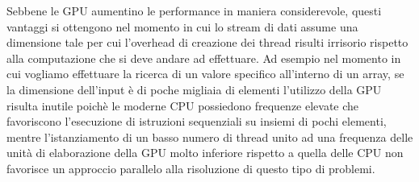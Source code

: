 Sebbene le GPU aumentino le performance in maniera considerevole, questi
vantaggi si ottengono nel momento in cui lo stream di dati assume
una dimensione tale per cui l'overhead di creazione dei thread risulti
irrisorio rispetto alla computazione che si deve andare ad effettuare.
Ad esempio nel momento in cui vogliamo effettuare la ricerca di un valore
specifico all'interno di un array, se la dimensione dell'input è di poche
migliaia di elementi l'utilizzo della GPU risulta inutile poichè
le moderne CPU possiedono frequenze elevate che favoriscono l'esecuzione
di istruzioni sequenziali su insiemi di pochi elementi, mentre l'istanziamento
di un basso numero di thread unito ad una frequenza delle unità di elaborazione
della GPU molto inferiore rispetto a quella delle CPU non favorisce un
approccio parallelo alla risoluzione di questo tipo di problemi.
